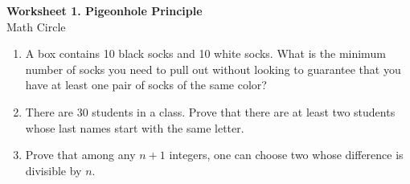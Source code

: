 \documentclass[12pt,a4paper]{article}
\begin{document}
\begin{center}
    {\large\bf Worksheet 1. Pigeonhole Principle} \\
    \vspace{2mm}
    {\small Math Circle}
\end{center}

\vspace{5mm}

\begin{enumerate}
    \item A box contains 10 black socks and 10 white socks. What is the minimum number of socks you need to pull out without looking to guarantee that you have at least one pair of socks of the same color?
    
    \item There are 30 students in a class. Prove that there are at least two students whose last names start with the same letter.
    
    \item Prove that among any $n+1$ integers, one can choose two whose difference is divisible by $n$.
\end{enumerate}
\end{document}
